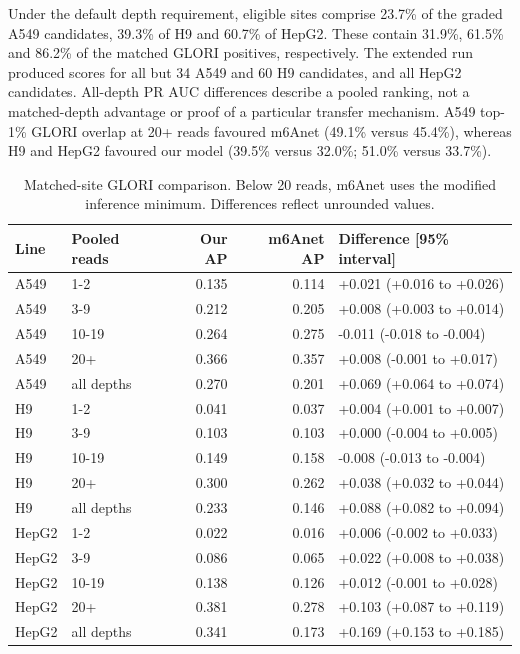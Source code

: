 \documentclass[11pt,a4paper]{article}
\begin{document}
Under the default depth requirement, eligible sites comprise 23.7\% of the
graded A549 candidates, 39.3\% of H9 and 60.7\% of HepG2. These contain
31.9\%, 61.5\% and 86.2\% of the matched GLORI positives, respectively.
The extended run produced scores for all but 34 A549 and 60 H9 candidates,
and all HepG2 candidates. All-depth PR AUC differences describe a pooled
ranking, not a matched-depth advantage or proof of a particular transfer
mechanism. A549 top-1\% GLORI overlap at 20+ reads favoured m6Anet
(49.1\% versus 45.4\%), whereas H9 and HepG2 favoured our model
(39.5\% versus 32.0\%; 51.0\% versus 33.7\%).

\begin{table}[H]
\centering\footnotesize\setlength{\tabcolsep}{3pt}
\begin{tabular}{llrrl}
\toprule
Line & Pooled reads & Our AP & m6Anet AP & Difference [95\% interval] \\
\midrule
A549 & 1-2 & 0.135 & 0.114 & +0.021 (+0.016 to +0.026) \\
A549 & 3-9 & 0.212 & 0.205 & +0.008 (+0.003 to +0.014) \\
A549 & 10-19 & 0.264 & 0.275 & -0.011 (-0.018 to -0.004) \\
A549 & 20+ & 0.366 & 0.357 & +0.008 (-0.001 to +0.017) \\
A549 & all depths & 0.270 & 0.201 & +0.069 (+0.064 to +0.074) \\
H9 & 1-2 & 0.041 & 0.037 & +0.004 (+0.001 to +0.007) \\
H9 & 3-9 & 0.103 & 0.103 & +0.000 (-0.004 to +0.005) \\
H9 & 10-19 & 0.149 & 0.158 & -0.008 (-0.013 to -0.004) \\
H9 & 20+ & 0.300 & 0.262 & +0.038 (+0.032 to +0.044) \\
H9 & all depths & 0.233 & 0.146 & +0.088 (+0.082 to +0.094) \\
HepG2 & 1-2 & 0.022 & 0.016 & +0.006 (-0.002 to +0.033) \\
HepG2 & 3-9 & 0.086 & 0.065 & +0.022 (+0.008 to +0.038) \\
HepG2 & 10-19 & 0.138 & 0.126 & +0.012 (-0.001 to +0.028) \\
HepG2 & 20+ & 0.381 & 0.278 & +0.103 (+0.087 to +0.119) \\
HepG2 & all depths & 0.341 & 0.173 & +0.169 (+0.153 to +0.185) \\
\bottomrule
\end{tabular}
\caption{Matched-site GLORI comparison. Below 20 reads, m6Anet uses the modified inference minimum. Differences reflect unrounded values.}
\label{tab:glori-m6anet-depth}
\end{table}
\end{document}
